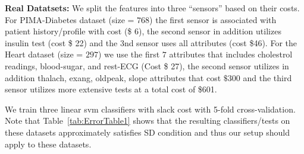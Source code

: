 {\bf Real Datatsets:} %
We split the features into three ``sensors'' based on their costs. For PIMA-Diabetes dataset (size = $768$) the first sensor is associated with patient history/profile with cost (\$ 6), the second sensor in addition utilizes  insulin test (cost \$ 22) and the 3nd sensor uses all attributes (cost \$46). For the Heart dataset (size = $297$) we use the first $7$ attributes that includes cholestrol readings, blood-sugar, and rest-ECG (Cost \$ 27), the second sensor utilizes in addition thalach, exang, oldpeak, slope attributes that cost $\$300$  and the third sensor utilizes more extensive tests at a total cost of \$601. 

We train three linear svm classifiers with slack cost with 5-fold cross-validation. Note that Table~\ref{tab:ErrorTable1} shows that the resulting classifiers/tests on these datasets approximately satisfies SD condition and thus our setup should apply to these datasets. 
%
%
%
%
